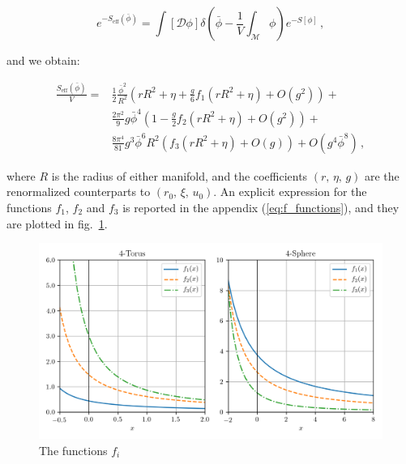 \documentclass[11pt,a4paper]{article}
\begin{document}
\begin{equation}
  e^{-S_{\mathrm{eff}}(\bar\phi)} = \int \left[\mathcal{D}\phi\right]
    \delta\left(\bar{\phi} - \frac{1}{V}\int_{\mathcal{M}}\phi\right)
    e^{-S[\phi]}\,,
\end{equation}

and we obtain:

\begin{equation}
\label{eq:effective_action}
\begin{split}
  \frac{S_{\mathrm{eff}}(\bar{\phi})}{V} = 
  &\frac{1}{2} \frac{\bar{\phi}^2}{R^2} \left(
    r R^2 + \eta + \frac{g}{6} f_1\left(r R^2 + \eta\right)
    + O\left(g^2\right)\right) + \\
  & \frac{2\pi^2}{9}g\bar{\phi}^4\left(
    1 - \frac{g}{2}f_2\left(r R^2 + \eta\right)
    + O\left(g^2\right)\right) + \\
  & \frac{8\pi^4}{81} g^3 \bar{\phi}^6 R^2\left(
    f_3\left(r R^2 + \eta\right)
    + O\left(g\right)\right) + O\left(g^4\bar{\phi}^8\right)\,,
\end{split}
\end{equation}

where $R$ is the radius of either manifold, and the coefficients
$(r,\,\eta,\,g)$ are the renormalized counterparts to $(r_0,\,\xi,\,u_0)$. An
explicit expression for the functions $f_1$, $f_2$ and $f_3$ is reported in the
appendix (\ref{eq:f_functions}), and they are plotted in
fig.~\ref{fig:f_functions}.

\begin{figure}
\begin{center}
\includegraphics{f_functions.png}
\end{center}
\caption{\label{fig:f_functions} The functions $f_i$}
\end{figure}
\end{document}
